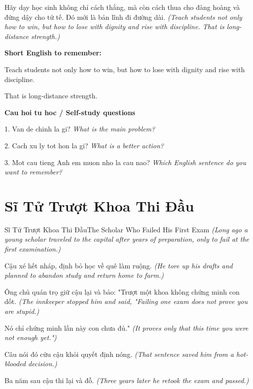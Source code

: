 \begin{baihoc}
Hãy dạy học sinh không chỉ cách thắng, mà còn cách thua cho đàng hoàng và đứng dậy cho tử tế. Đó mới là bản lĩnh đi đường dài.
\textit{(Teach students not only how to win, but how to lose with dignity and rise with discipline. That is long-distance strength.)}
\end{baihoc}

\begin{ghinhoanh}
\textbf{Short English to remember:}

Teach students not only how to win, but how to lose with dignity and rise with discipline.

That is long-distance strength.

\end{ghinhoanh}

\begin{tuhocnhanh}
\textbf{Cau hoi tu hoc / Self-study questions}

1. Van de chinh la gi? \textit{What is the main problem?}

2. Cach xu ly tot hon la gi? \textit{What is a better action?}

3. Mot cau tieng Anh em muon nho la cau nao? \textit{Which English sentence do you want to remember?}
\end{tuhocnhanh}
\ngancach

\section{Sĩ Tử Trượt Khoa Thi Đầu}
\begin{truyen}{Sĩ Tử Trượt Khoa Thi Đầu}{The Scholar Who Failed His First Exam}
\textit{(Long ago a young scholar traveled to the capital after years of preparation, only to fail at the first examination.)}

Cậu xé hết nháp, định bỏ học về quê làm ruộng.
\textit{(He tore up his drafts and planned to abandon study and return home to farm.)}

Ông chủ quán trọ giữ cậu lại và bảo: "Trượt một khoa không chứng minh con dốt.
\textit{(The innkeeper stopped him and said, "Failing one exam does not prove you are stupid.)}

Nó chỉ chứng minh lần này con chưa đủ."
\textit{(It proves only that this time you were not enough yet.")}

Câu nói đó cứu cậu khỏi quyết định nóng.
\textit{(That sentence saved him from a hot-blooded decision.)}

Ba năm sau cậu thi lại và đỗ.
\textit{(Three years later he retook the exam and passed.)}

\end{truyen}

